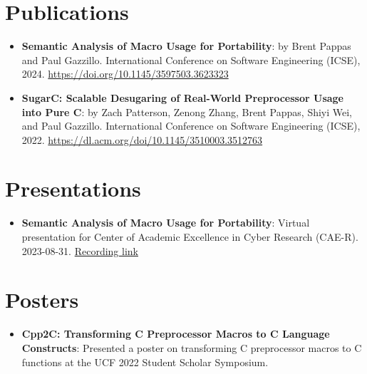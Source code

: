 \documentclass{article}
\newcommand{\resumeItem}[2]{
  \item\small{
    \textbf{#1}{: #2 \vspace{-2pt}}
  }
}
\newcommand{\resumeSubItem}[2]{\resumeItem{#1}{#2}\vspace{-3pt}}
\newcommand{\resumeSubHeadingListStart}{\begin{itemize}[leftmargin=*, label={}]}
\newcommand{\resumeSubHeadingListEnd}{\end{itemize}}
\begin{document}
\vspace{-5pt}
\section{Publications}
\resumeSubHeadingListStart

\resumeSubItem
{Semantic Analysis of Macro Usage for Portability}
{by Brent Pappas and Paul Gazzillo. International Conference on Software Engineering (ICSE), 2024. \url{https://doi.org/10.1145/3597503.3623323}}

\resumeSubItem
{SugarC: Scalable Desugaring of Real-World Preprocessor Usage into Pure C}
{by Zach Patterson, Zenong Zhang, Brent Pappas, Shiyi Wei, and Paul Gazzillo. International Conference on Software Engineering (ICSE), 2022. \url{https://dl.acm.org/doi/10.1145/3510003.3512763}}
\resumeSubHeadingListEnd

\vspace{-5pt}
\section{Presentations}
\resumeSubHeadingListStart
\resumeSubItem
{Semantic Analysis of Macro Usage for Portability}
{Virtual presentation for Center of Academic Excellence in Cyber Research (CAE-R). 2023-08-31. \href{https://drive.google.com/file/d/1xCd34w54hs1iyaoXHz0MUkwlH-fP3HLo/view} {Recording link}}
\resumeSubHeadingListEnd

\vspace{-5pt}
\section{Posters}
\resumeSubHeadingListStart
\resumeSubItem
{Cpp2C: Transforming C Preprocessor Macros to C Language Constructs}
{Presented a poster on transforming C preprocessor macros to C functions at the UCF 2022 Student Scholar Symposium.}
\resumeSubHeadingListEnd

\vspace{-5pt}
\end{document}
